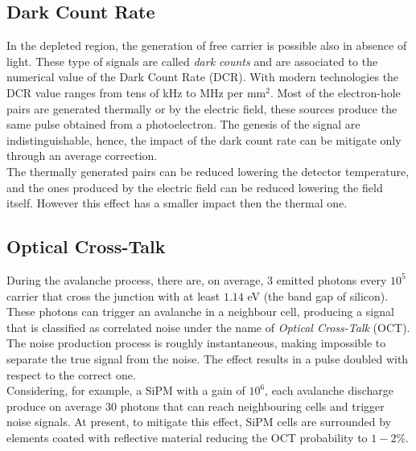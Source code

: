 \subsection{Dark Count Rate}
In the depleted region, the generation of free carrier is possible also in absence of light. These type of signals are called \textit{dark counts} and are associated to the numerical value of the Dark Count Rate (DCR). With modern technologies the DCR value ranges from tens of kHz to MHz per mm$^2$. Most of the electron-hole pairs are generated thermally or by the electric field, these sources produce the same pulse obtained from a photoelectron. The genesis of the signal are indistinguishable, hence, the impact of the dark count rate can be mitigate only through an average correction.\\
The thermally generated pairs can be reduced lowering the detector temperature, and the ones produced by the electric field can be reduced lowering the field itself. However this effect has a smaller impact then the thermal one.\\

\subsection{Optical Cross-Talk}
During the avalanche process, there are, on average, $3$ emitted photons every $10^5$ carrier that cross the junction with at least $1.14$ eV (the band gap of silicon). These photons can trigger an avalanche in a neighbour cell, producing a signal that is classified as correlated noise under the name of \textit{Optical Cross-Talk} (OCT).\\
The noise production process is roughly instantaneous, making impossible to separate the true signal from the noise. The effect results in a pulse doubled with respect to the correct one.\\
Considering, for example, a SiPM with a gain of $10^6$, each avalanche discharge produce on average $30$ photons that can reach neighbouring cells and trigger noise signals.
At present, to mitigate this effect, SiPM cells are surrounded by elements coated with reflective material reducing the OCT probability to $1-2\%$.\\

